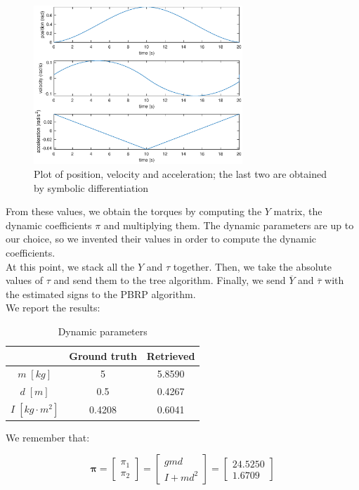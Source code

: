 \documentclass{article}
\begin{document}
\begin{figure}[!htbp]
\centering
\includegraphics[width=0.7\textwidth]{images/1-dof/trajectory_easy1.eps}
\caption{Plot of position, velocity and acceleration; the last two are obtained by symbolic differentiation}
\end{figure}
\FloatBarrier

From these values, we obtain the torques by computing the $Y$ matrix, the dynamic coefficients $\pi$ and multiplying them. The dynamic parameters are up to our choice, so we invented their values in order to compute the dynamic coefficients. \\

At this point, we stack all the $Y$ and $\tau$ together. Then, we take the absolute values of $\tau$ and send them to the tree algorithm. Finally, we send $\overline{Y}$ and $\overline{\tau}$ with the estimated signs to the PBRP algorithm. \\

We report the results:

\begin{table}[!htbp]
\centering
\begin{tabular}{|c|cc|}
\hline
& Ground truth & Retrieved\\
\hline
$m\;[kg]$ & 5 & 5.8590\\ 
$d\;[m]$ & 0.5 & 0.4267\\
$I\;[kg\cdot m^2]$ & 0.4208 & 0.6041\\
\hline
\end{tabular}
\caption{Dynamic parameters}
\end{table}
\FloatBarrier

We remember that:

\[\bm{\pi}= \begin{bmatrix}
\pi_1 \\ \pi_2
\end{bmatrix} = \begin{bmatrix}
gmd \\ I +md^2
\end{bmatrix}= \begin{bmatrix}
24.5250 \\ 1.6709
\end{bmatrix}\]
\end{document}
